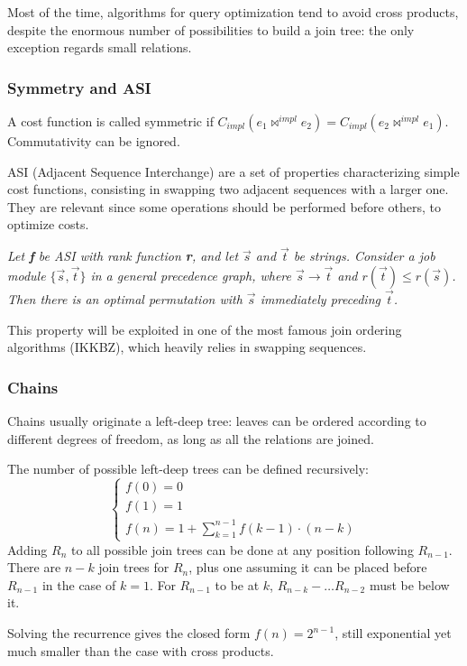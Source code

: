 Most of the time, algorithms for query optimization tend to avoid cross products, despite the enormous number of possibilities to build a join tree: the only exception regards small relations.

\subsubsection{Symmetry and ASI}
A cost function is called symmetric if $C_{impl}(e_1 \bowtie^{impl} e_2) = C_{impl}(e_2 \bowtie^{impl} e_1)$. Commutativity can be ignored.

ASI (Adjacent Sequence Interchange) are a set of properties characterizing simple cost functions, consisting in swapping two adjacent sequences with a larger one. They are relevant since some operations should be performed before others, to optimize costs. 

\textit{Let \textbf{f} be ASI with rank function \textbf{r}, and let $\vec s$ and $\vec t$ be strings. Consider a job module $\{\vec s, \vec t\}$ in a general precedence graph, where $\vec s \rightarrow \vec t$ and $r(\vec t) \leq r(\vec s)$. Then there is an optimal permutation with $\vec s$
immediately preceding $\vec t$.}

This property will be exploited in one of the most famous join ordering algorithms (IKKBZ), which heavily relies in swapping sequences.

\subsubsection{Chains}
Chains usually originate a left-deep tree: leaves can be ordered according to different degrees of freedom, as long as all the relations are joined. 

The number of possible left-deep trees can be defined recursively:
$$\begin{cases}
f(0) = 0 \\
f(1) = 1 \\
f(n) = 1 + \sum_{k=1}^{n-1} f(k-1) \cdot (n - k)
\end{cases}$$
Adding $R_n$ to all possible join trees can be done at any position following $R_{n-1}$. There are $n - k$ join trees for $R_n$, plus one assuming it can be placed before $R_{n-1}$ in the case of $k=1$. For $R_{n-1}$ to be at $k$, $R_{n-k} - \dots R_{n-2}$ must be below it.

Solving the recurrence gives the closed form $f(n) = 2^{n-1}$, still exponential yet much smaller than the case with cross products.

